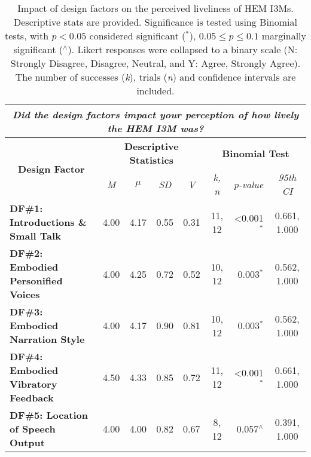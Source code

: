 \begin{table*}[b!]
\caption{Impact of design factors on the perceived liveliness of HEM I3Ms. Descriptive stats are provided. Significance is tested using Binomial tests, with $p < 0.05$ considered significant ($^\ast$), $0.05 \leq p \leq 0.1$ marginally significant ($^\wedge$). Likert responses were collapsed to a binary scale (N: Strongly Disagree, Disagree, Neutral, and Y: Agree, Strongly Agree). The number of successes (\textit{k}), trials (\textit{n}) and confidence intervals are included.}
\label{table:5}
\begin{tabular}{@{}cccccccc@{}}
\toprule
\multicolumn{8}{c}{\textit{\textbf{Did the design factors impact your perception of how lively the HEM I3M was?}}}               \\ \midrule
\multicolumn{1}{c|}{\multirow{3}{*}{\textbf{Design Factor}}} &
  \multicolumn{4}{c|}{\multirow{2}{*}{\textbf{Descriptive Statistics}}} &
  \multicolumn{3}{c}{\multirow{2}{*}{\textbf{Binomial Test}}} \\
\multicolumn{1}{c|}{}                                     & \multicolumn{4}{c|}{}                          & \multicolumn{3}{c}{}       \\
\multicolumn{1}{c|}{} &
  \textit{M} &
  \textit{$\mu$} &
  \textit{SD} &
  \multicolumn{1}{c|}{\textit{V}} &
  \textit{k, n} &
  \textit{p-value} &
  \textit{95th CI} \\ \midrule
\multicolumn{1}{l|}{\textbf{DF\#1: Introductions \& Small Talk}} & 4.00 & 4.17 & 0.55 & \multicolumn{1}{c|}{0.31} & 11, 12 & \multicolumn{1}{r}{<0.001$^\ast$} & 0.661, 1.000 \\
\multicolumn{1}{l|}{\textbf{DF\#2: Embodied Personified Voices}} & 4.00 & 4.25 & 0.72 & \multicolumn{1}{c|}{0.52} & 10, 12 & \multicolumn{1}{r}{0.003$^\ast$} & 0.562, 1.000 \\
\multicolumn{1}{l|}{\textbf{DF\#3: Embodied Narration Style}}             & 4.00 & 4.17 & 0.90 & \multicolumn{1}{c|}{0.81} & 10, 12 & \multicolumn{1}{r}{0.003$^\ast$} & 0.562, 1.000 \\
\multicolumn{1}{l|}{\textbf{DF\#4: Embodied Vibratory Feedback}}   & 4.50 & 4.33 & 0.85 & \multicolumn{1}{c|}{0.72} & 11, 12 & \multicolumn{1}{r}{<0.001$^\ast$} & 0.661, 1.000 \\
\multicolumn{1}{l|}{\textbf{DF\#5: Location of Speech Output}}                        & 4.00 & 4.00 & 0.82 & \multicolumn{1}{l|}{0.67} & 8, 12 & \multicolumn{1}{r}{0.057$^\wedge$} & 0.391, 1.000 \\ \bottomrule
\end{tabular}
\end{table*}